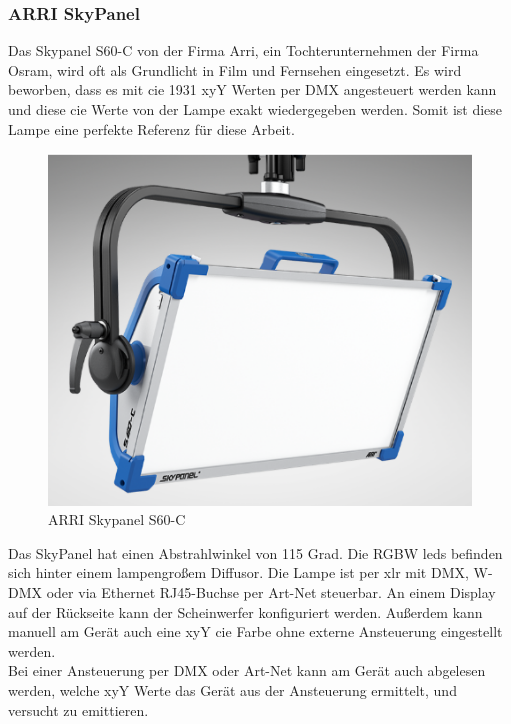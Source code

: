 \documentclass[11pt]{scrartcl}
\begin{document}
\subsubsection{ARRI SkyPanel}
Das Skypanel S60-C von der Firma Arri, ein Tochterunternehmen der Firma Osram, wird oft als Grundlicht in Film und Fernsehen eingesetzt.
Es wird beworben, dass es mit \ac{cie} 1931 xyY Werten per DMX angesteuert werden kann und diese \ac{cie} Werte von der Lampe exakt wiedergegeben werden. Somit
ist diese Lampe eine perfekte Referenz für diese Arbeit.
\begin{figure}[H]
    \begin{center}
        \includegraphics[width=.48\textwidth]{images/skypanel_s60_c.png}
    \end{center}
    \caption{ARRI Skypanel S60-C \cite{arri}}
\end{figure}
\noindent
Das SkyPanel hat einen Abstrahlwinkel von 115 Grad. Die RGBW \ac{led}s befinden sich hinter einem lampengroßem Diffusor. Die Lampe ist per
\ac{xlr} mit DMX, W-DMX oder via Ethernet RJ45-Buchse per Art-Net steuerbar. An einem Display auf der Rückseite kann der Scheinwerfer konfiguriert
werden. Außerdem kann manuell am Gerät auch eine xyY \ac{cie} Farbe ohne externe Ansteuerung eingestellt werden.\\
Bei einer Ansteuerung per DMX oder Art-Net kann am Gerät auch abgelesen werden, welche xyY Werte das Gerät aus der Ansteuerung ermittelt,
und versucht zu emittieren.
\end{document}
